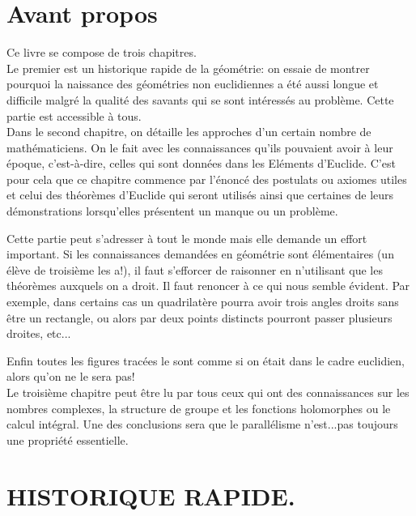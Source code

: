 \documentclass[a4paper, 12pt, twoside]{book}
\begin{document}
\frontmatter

\part{Avant propos}

Ce livre se compose de trois chapitres.\\

Le premier est un historique rapide de la géométrie: on essaie de montrer pourquoi la naissance des géométries non euclidiennes a été aussi longue et difficile malgré la qualité des savants qui se sont intéressés au problème. Cette partie est accessible à tous.\\

Dans le second chapitre, on détaille les approches d'un certain nombre de mathématiciens. On le fait avec les connaissances qu'ils pouvaient avoir à leur époque, c'est-à-dire, celles qui sont données dans les Eléments d'Euclide. C'est pour cela que ce chapitre commence par l'énoncé des postulats ou axiomes utiles et celui des théorèmes d'Euclide qui seront utilisés ainsi que certaines de leurs démonstrations lorsqu'elles présentent un manque ou un problème.\

Cette partie peut s'adresser à tout le monde mais elle demande un effort important. Si les connaissances demandées en géométrie sont élémentaires (un élève de troisième les a!), il faut s'efforcer de raisonner en n'utilisant que les théorèmes auxquels on a droit. Il faut renoncer  à ce qui nous semble évident. Par exemple, dans certains cas un quadrilatère pourra avoir trois angles droits sans être un rectangle, ou alors par deux points distincts pourront passer plusieurs droites, etc...\

Enfin toutes les figures tracées le sont comme si on était dans le cadre euclidien, alors qu'on ne le sera pas! \\

Le troisième chapitre peut être lu par tous ceux qui ont des connaissances sur les nombres complexes, la structure de groupe et  les fonctions holomorphes ou le calcul intégral. Une des conclusions sera que le parallélisme n'est...pas toujours  une propriété essentielle.  

  
\tableofcontents

\mainmatter


\part{HISTORIQUE RAPIDE.}
\end{document}
